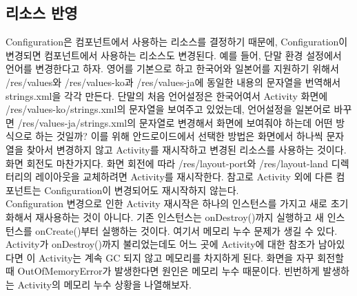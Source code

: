 \subsection{리소스 반영}
Configuration은 컴포넌트에서 사용하는 리소스를 결정하기 때문에,  Configuration이 변경되면 컴포넌트에서 사용하는 리소스도 변경된다. 
예를 들어, 단말 환경 설정에서 언어를 변경한다고 하자. 
영어를 기본으로 하고 한국어와 일본어를 지원하기 위해서 /res/values와 /res/values-ko과 /res/values-ja에 동일한 내용의 문자열을 번역해서 strings.xml을 각각 만든다. 
단말의 처음 언어설정은 한국어여서 Activity 화면에 /res/values-ko/strings.xml의 문자열을 보여주고 있었는데, 언어설정을 일본어로 바꾸면 /res/values-ja/strings.xml의 문자열로 변경해서 화면에 보여줘야 하는데 어떤 방식으로 하는 것일까?
이를 위해 안드로이드에서 선택한 방법은 화면에서 하나씩 문자열을 찾아서 변경하지 않고 Activity를 재시작하고 변경된 리소스를 사용하는 것이다.
화면 회전도 마찬가지다. 화면 회전에 따라 /res/layout-port와 /res/layout-land 디렉터리의 레이아웃을 교체하려면 Activity를 재시작한다. 
참고로 Activity 외에 다른 컴포넌트는 Configuration이 변경되어도 재시작하지 않는다.\\

Configuration 변경으로 인한 Activity 재시작은 하나의 인스턴스를 가지고 새로 초기화해서 재사용하는 것이 아니다. 
기존 인스턴스는 onDestroy()까지 실행하고 새 인스턴스를 onCreate()부터 실행하는 것이다. 여기서 메모리 누수 문제가 생길 수 있다. 
Activity가 onDestroy()까지 불리었는데도 어느 곳에 Activity에 대한 참조가 남아있다면 이 Activity는 계속 GC 되지 않고 메모리를 차지하게 된다. 
화면을 자꾸 회전할 때 OutOfMemoryError가 발생한다면 원인은 메모리 누수 때문이다. 빈번하게 발생하는 Activity의 메모리 누수 상황을 나열해보자.

